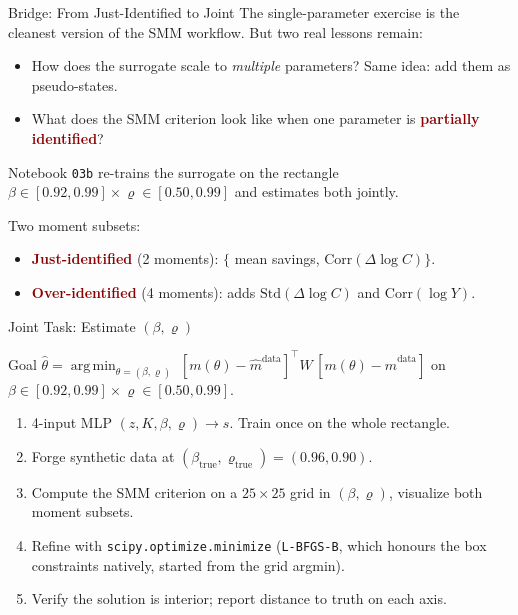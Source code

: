 \documentclass[10pt,aspectratio=169]{beamer}
\newcommand{\emphc}[1]{\textbf{\textcolor{darkred}{#1}}}
\DeclareMathOperator*{\argmin}{arg\,min}
\begin{document}
\begin{frame}{Bridge: From Just-Identified to Joint}
\small
The single-parameter exercise is the cleanest version of the SMM workflow. But two real lessons remain:
\begin{itemize}
\itemsep1pt
  \item How does the surrogate scale to \emph{multiple} parameters? Same idea: add them as pseudo-states.
  \item What does the SMM criterion look like when one parameter is \emphc{partially identified}?
\end{itemize}
\vspace{0.1cm}
Notebook \texttt{03b} re-trains the surrogate on the rectangle $\beta \in [0.92, 0.99] \times \varrho \in [0.50, 0.99]$ and estimates both jointly.

\vspace{0.2cm}
Two moment subsets:
\begin{itemize}
  \item \emphc{Just-identified} (2 moments): $\{$ mean savings, $\mathrm{Corr}(\Delta\log C)\}$.
  \item \emphc{Over-identified} (4 moments): adds $\mathrm{Std}(\Delta\log C)$ and $\mathrm{Corr}(\log Y)$.
\end{itemize}
\end{frame}

\begin{frame}{Joint Task: Estimate $(\beta, \varrho)$}
\begin{block}{Goal}
$\hat\theta = \argmin_{\theta = (\beta,\varrho)}\; [m(\theta) - \hat{m}^{\mathrm{data}}]^\top W\, [m(\theta) - \hat{m}^{\mathrm{data}}]$ \quad on $\beta\in[0.92,0.99] \times \varrho\in[0.50, 0.99]$.
\end{block}
\begin{enumerate}
  \itemsep1pt
  \item 4-input MLP $(z, K, \beta, \varrho) \to s$. Train once on the whole rectangle.
  \item Forge synthetic data at $(\beta_{\text{true}}, \varrho_{\text{true}}) = (0.96, 0.90)$.
  \item Compute the SMM criterion on a $25\times 25$ grid in $(\beta, \varrho)$, visualize both moment subsets.
  \item Refine with \texttt{scipy.optimize.minimize} (\texttt{L-BFGS-B}, which honours the box constraints natively, started from the grid argmin).
  \item Verify the solution is interior; report distance to truth on each axis.
\end{enumerate}
\end{frame}
\end{document}
